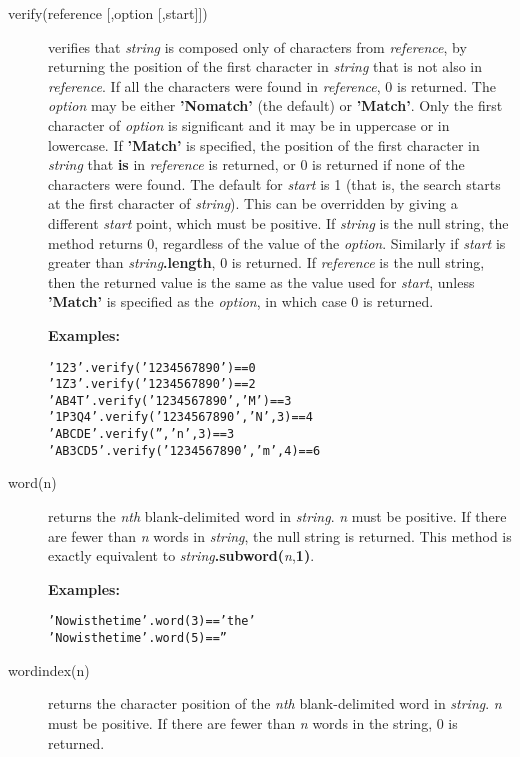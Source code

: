 \begin{description}
\item[verify(reference [,option [,start{]]})]\label{refverify}
verifies that \emph{string} is composed only of characters
from \emph{reference}, by returning the position of the first
character in \emph{string} that is not also in
\emph{reference}.  If all the characters were found in
\emph{reference}, 0 is returned.
 The \emph{option} may be either \textbf{'Nomatch'} (the
default) or \textbf{'Match'}.  Only the first character of
\emph{option} is significant and it may be in uppercase or in
lowercase.
If \textbf{'Match'} is specified, the position of the first character
in \emph{string} that \textbf{is} in \emph{reference} is
returned, or 0 is returned if none of the characters were found.
 The default for \emph{start} is 1 (that is, the search starts at
the first character of \emph{string}).
This can be overridden by giving a different \emph{start} point,
which must be positive.
 If \emph{string} is the null string, the method returns 0,
regardless of the value of the \emph{option}.
Similarly if \emph{start} is greater than
\emph{string}\textbf{.length}, 0 is returned.
 If \emph{reference} is the null string, then the returned value
is the same as the value used for \emph{start},
unless \textbf{'Match'} is specified as the \emph{option}, in
which case 0 is returned.
 
\textbf{Examples:}
\begin{alltt}
'123'.verify('1234567890')          == 0
'1Z3'.verify('1234567890')          == 2
'AB4T'.verify('1234567890','M')     == 3
'1P3Q4'.verify('1234567890','N',3)  == 4
'ABCDE'.verify('','n',3)            == 3
'AB3CD5'.verify('1234567890','m',4) == 6
\end{alltt}

\item[word(n)]\label{refword}
returns the \emph{n}\emph{th} blank-delimited word in
\emph{string}.
\emph{n} must be positive.
If there are fewer than \emph{n} words in \emph{string}, the
null string is returned.
This method is exactly equivalent to
\emph{string}\textbf{.subword(}\emph{n},\textbf{1)}.
 
\textbf{Examples:}
\begin{alltt}
'Now is the time'.word(3) == 'the'
'Now is the time'.word(5) == ''
\end{alltt}

\item[wordindex(n)]\label{refwordind}
returns the character position of the \emph{n}\emph{th}
blank-delimited word in \emph{string}.
\emph{n} must be positive.
If there are fewer than \emph{n} words in the string, 0 is returned.
 

\end{description}
